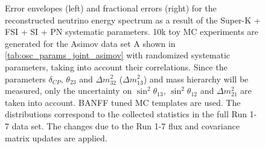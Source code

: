 \begin{figure}[htb]
\caption {
Error envelopes (left) and fractional errors (right) for the reconstructed neutrino energy spectrum
as a result of the Super-K + FSI + SI + PN systematic parameters.
10k toy MC experiments are generated for the Asimov data set A shown in \cref{tab:osc_params_joint_asimov}
with randomized systematic parameters, taking into account their correlations.
Since the parameters $\delta_{CP}$, $\theta_{23}$ and $\Delta m^2_{32}$ ($\Delta m^2_{13}$) and mass hierarchy
will be measured,
only the uncertainty on 
$\sin^2 \theta_{13}$,
$\sin^2 \theta_{12}$
and 
$\Delta m^2_{21}$ 
are taken into account.
BANFF tuned MC templates are used. 
The distributions correspond to the collected statistics in the full Run 1-7 data set.
The changes due to the Run 1-7 flux and covariance matrix updates are applied.
}
\label{fig:SKDet_FSI_envelope_Asimov_A_run17}
\end{figure}





